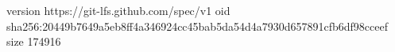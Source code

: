 version https://git-lfs.github.com/spec/v1
oid sha256:20449b7649a5eb8ff4a346924cc45bab5da54d4a7930d657891cfb6df98cceef
size 174916
